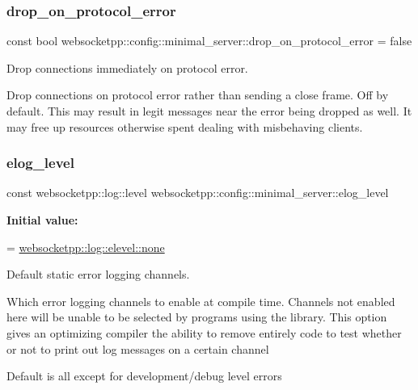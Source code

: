 \subsubsection{\texorpdfstring{drop\+\_\+on\+\_\+protocol\+\_\+error}{drop\_on\_protocol\_error}}
{\footnotesize\ttfamily const bool websocketpp\+::config\+::minimal\+\_\+server\+::drop\+\_\+on\+\_\+protocol\+\_\+error = false\hspace{0.3cm}{\ttfamily [static]}}



Drop connections immediately on protocol error. 

Drop connections on protocol error rather than sending a close frame. Off by default. This may result in legit messages near the error being dropped as well. It may free up resources otherwise spent dealing with misbehaving clients. \mbox{\label{structwebsocketpp_1_1config_1_1minimal__server_a3682c9c0dc879a125eff396be7babf4e}} 
\subsubsection{\texorpdfstring{elog\+\_\+level}{elog\_level}}
{\footnotesize\ttfamily const websocketpp\+::log\+::level websocketpp\+::config\+::minimal\+\_\+server\+::elog\+\_\+level\hspace{0.3cm}{\ttfamily [static]}}

{\bfseries Initial value\+:}
\begin{DoxyCode}
=
        \mbox{\hyperlink{structwebsocketpp_1_1log_1_1elevel_ae86395aa26ec2089e07fd63b62a549fa}{websocketpp::log::elevel::none}}
\end{DoxyCode}


Default static error logging channels. 

Which error logging channels to enable at compile time. Channels not enabled here will be unable to be selected by programs using the library. This option gives an optimizing compiler the ability to remove entirely code to test whether or not to print out log messages on a certain channel

Default is all except for development/debug level errors \mbox{\label{structwebsocketpp_1_1config_1_1minimal__server_a671a693af60cb11d9526d58aedce515c}} 

